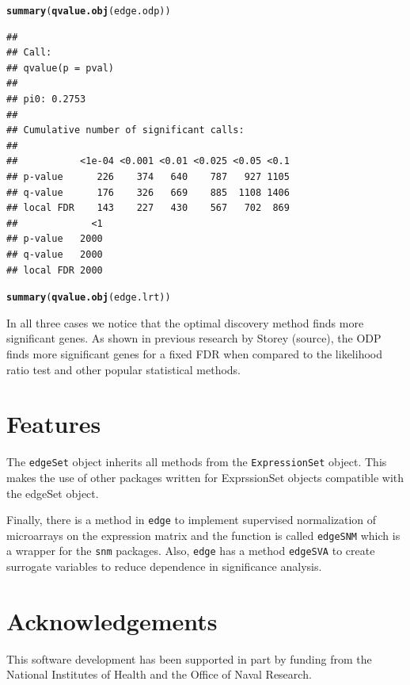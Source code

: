 \documentclass{article}\usepackage[]{graphicx}\usepackage[]{color}
\makeatletter
\newcommand{\hlstd}[1]{\textcolor[rgb]{0.345,0.345,0.345}{#1}}%
\newcommand{\hlkwd}[1]{\textcolor[rgb]{0.737,0.353,0.396}{\textbf{#1}}}%
\newenvironment{kframe}{%
 \def\at@end@of@kframe{}%
 \ifinner\ifhmode%
  \def\at@end@of@kframe{\end{minipage}}%
  \begin{minipage}{\columnwidth}%
 \fi\fi%
 \def\FrameCommand##1{\hskip\@totalleftmargin \hskip-\fboxsep
 \colorbox{shadecolor}{##1}\hskip-\fboxsep
     \hskip-\linewidth \hskip-\@totalleftmargin \hskip\columnwidth}%
 \MakeFramed {\advance\hsize-\width
   \@totalleftmargin\z@ \linewidth\hsize
   \@setminipage}}%
 {\par\unskip\endMakeFramed%
 \at@end@of@kframe}
\newenvironment{knitrout}{}{} %
\makeatother
\begin{document}
\begin{knitrout}
\color{fgcolor}\begin{kframe}
\begin{alltt}
\hlkwd{summary}\hlstd{(}\hlkwd{qvalue.obj}\hlstd{(edge.odp))}
\end{alltt}
\begin{verbatim}
## 
## Call:
## qvalue(p = pval)
## 
## pi0:	0.2753	
## 
## Cumulative number of significant calls:
## 
##           <1e-04 <0.001 <0.01 <0.025 <0.05 <0.1
## p-value      226    374   640    787   927 1105
## q-value      176    326   669    885  1108 1406
## local FDR    143    227   430    567   702  869
##             <1
## p-value   2000
## q-value   2000
## local FDR 2000
\end{verbatim}
\begin{alltt}
\hlkwd{summary}\hlstd{(}\hlkwd{qvalue.obj}\hlstd{(edge.lrt))}
\end{alltt}


{\ttfamily\noindent\bfseries\color{errorcolor}{\#\# Error: error in evaluating the argument 'object' in selecting a method for function 'qvalue.obj': Error: object 'edge.lrt' not found}}\end{kframe}
\end{knitrout}


In all three cases we notice that the optimal discovery method finds more significant genes. As shown in previous research by Storey (source), the ODP finds more significant genes for a fixed FDR when compared to the likelihood ratio test and other popular statistical methods.


\section{Features}
The \texttt{edgeSet} object inherits all methods from the \texttt{ExpressionSet} object. This makes the use of other packages written for ExprssionSet objects compatible with the edgeSet object. 

Finally, there is a method in \texttt{edge} to implement supervised normalization of microarrays on the expression matrix and the function is called \texttt{edgeSNM} which is a wrapper for the {\tt snm} packages. Also, {\tt edge} has a method {\tt edgeSVA} to create surrogate variables to reduce dependence in significance analysis.

\section*{Acknowledgements}
This software development has been supported in part by funding from the National Institutes of Health and the Office of Naval Research.



\end{document}
